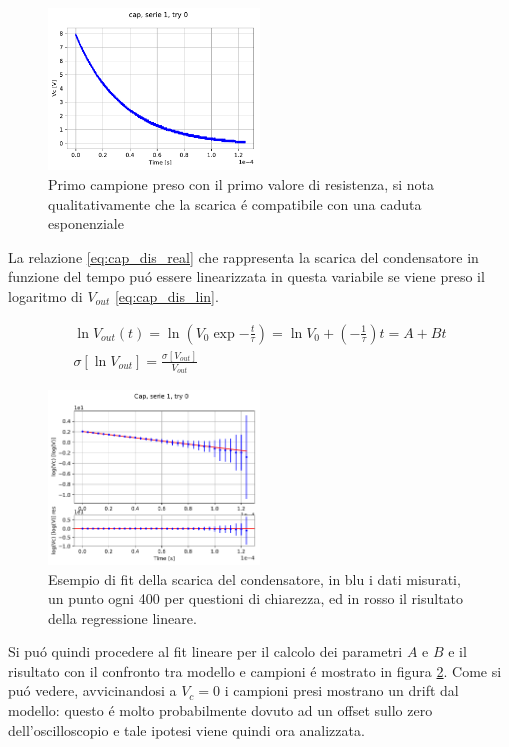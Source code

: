 \documentclass{article}
\begin{document}
\begin{figure}[h]
    \centering
    \includegraphics[width = 0.5\textwidth]{capserie1try0.pdf}
    \caption{Primo campione preso con il primo valore di resistenza, si nota qualitativamente che la scarica \'e compatibile con una caduta esponenziale}
    \label{fig:cap_dis_ex}
\end{figure}

La relazione \ref{eq:cap_dis_real} che rappresenta la scarica del condensatore in funzione del tempo pu\'o essere linearizzata in questa variabile se viene preso il logaritmo di $V_{out}$ \ref{eq:cap_dis_lin}.

\begin{gather}
	\ln{V_{out}(t)} = \ln{ \left( V_0 \exp{ -\frac{t}{\tau} } \right) } = \ln{V_0} + \left( -\frac{1}{\tau} \right) t = A + B t \\
	\sigma[\ln{V_{out}}]=\frac{\sigma[V_{out}]}{V_{out}}
	\label{eq:cap_dis_lin}
\end{gather}

\begin{figure}[h]
    \centering
    \includegraphics[width = 0.5\textwidth]{fitplot6.pdf}
    \caption{Esempio di fit della scarica del condensatore, in blu i dati misurati, un punto ogni 400 per questioni di chiarezza, ed in rosso il risultato della regressione lineare.}
    \label{fig:cap_dis_ex_lin}
\end{figure}

Si pu\'o quindi procedere al fit lineare per il calcolo dei parametri $A$ e $B$ e il risultato con il confronto tra modello e campioni \'e mostrato in figura \ref{fig:cap_dis_ex_lin}. Come si pu\'o vedere, avvicinandosi a $V_c = 0$ i campioni presi mostrano un drift dal modello: questo \'e molto probabilmente dovuto ad un offset sullo zero dell'oscilloscopio e tale ipotesi viene quindi ora analizzata.
\end{document}
